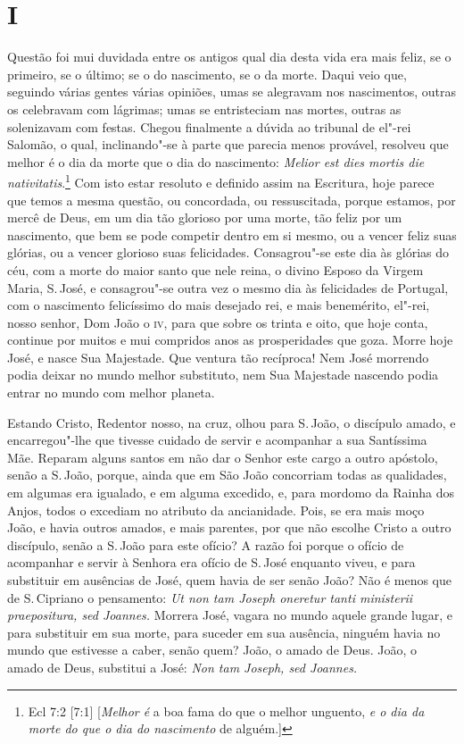 \section*{I}

\noindent{}Questão foi mui duvidada entre os antigos qual dia desta vida era mais
feliz, se o primeiro, se o último; se o do nascimento, se o da morte.
Daqui veio que, seguindo várias gentes várias opiniões, umas se
alegravam nos nascimentos, outras os celebravam com lágrimas; umas se
entristeciam nas mortes, outras as solenizavam com festas. Chegou
finalmente a dúvida ao tribunal de el"-rei Salomão, o qual, inclinando"-se
à parte que parecia menos provável, resolveu que melhor é o dia da morte
que o dia do nascimento: \emph{Melior est dies mortis die nativitatis}.\footnote{Ecl 7:2 [7:1] [\textit{Melhor é} a boa fama do que o melhor unguento, \textit{e o dia da morte do que o dia do nascimento} de alguém.]}
Com isto estar resoluto e definido assim na Escritura,
hoje parece que temos a mesma questão, ou concordada, ou ressuscitada,
porque estamos, por mercê de Deus, em um dia tão glorioso por uma morte,
tão feliz por um nascimento, que bem se pode competir dentro em si
mesmo, ou a vencer feliz suas glórias, ou a vencer glorioso suas
felicidades. Consagrou"-se este dia às glórias do céu, com a morte do
maior santo que nele reina, o divino Esposo da Virgem Maria, S.\,José, e
consagrou"-se outra vez o mesmo dia às felicidades de Portugal, com o
nascimento felicíssimo do mais desejado rei, e mais benemérito, el"-rei,
nosso senhor, Dom João o \textsc{iv}, para que sobre os trinta e oito, que hoje
conta, continue por muitos e mui compridos anos as prosperidades que
goza. Morre hoje José, e nasce Sua Majestade. Que ventura tão recíproca!
Nem José morrendo podia deixar no mundo melhor substituto, nem Sua
Majestade nascendo podia entrar no mundo com melhor planeta.

Estando Cristo, Redentor nosso, na cruz, olhou para S.\,João, o discípulo
amado, e encarregou"-lhe que tivesse cuidado de servir e acompanhar a sua
Santíssima Mãe. Reparam alguns santos em não dar o Senhor este cargo a
outro apóstolo, senão a S.\,João, porque, ainda que em São João
concorriam todas as qualidades, em algumas era igualado, e em alguma
excedido, e, para mordomo da Rainha dos Anjos, todos o excediam no
atributo da ancianidade. Pois, se era mais moço João, e havia outros
amados, e mais parentes, por
que não escolhe Cristo a outro discípulo, senão a S.\,João para este
ofício? A razão foi porque o ofício de acompanhar e servir à Senhora era
ofício de S.\,José enquanto viveu, e para substituir em ausências de
José, quem havia de ser senão João? Não é menos que de S.\,Cipriano o
pensamento: \emph{Ut non tam Joseph oneretur tanti ministerii
praepositura, sed Joannes.} Morrera José, vagara no mundo aquele
grande lugar, e para substituir em sua morte, para suceder em sua
ausência, ninguém havia no mundo que estivesse a caber, senão quem?
João, o amado de Deus. João, o amado de Deus, substitui a José:
\emph{Non tam Joseph, sed Joannes.}

